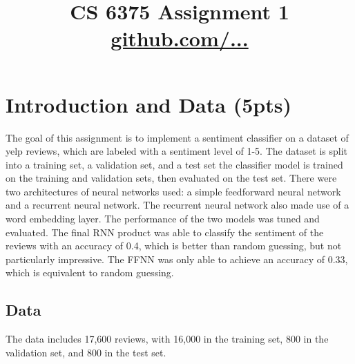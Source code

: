 \documentclass[conference]{IEEEtran}
\begin{document}
\title{CS 6375 Assignment 1 \\
\href{github.com/...}{github.com/...}
}

\author{
}

\maketitle


\section{Introduction and Data (5pts)}

The goal of this assignment is to implement a sentiment classifier on a dataset of yelp reviews, which are labeled with a sentiment level of 1-5. The dataset is split into a training set, a validation set, and a test set the classifier model is trained on the training and validation sets, then evaluated on the test set. There were two architectures of neural networks used: a simple feedforward neural network and a recurrent neural network. The recurrent neural network also made use of a word embedding layer. The performance of the two models was tuned and evaluated. 
The final RNN product was able to classify the sentiment of the reviews with an accuracy of 0.4, which is better than random guessing, but not particularly impressive. 
The FFNN was only able to achieve an accuracy of 0.33, which is equivalent to random guessing.

\subsection{Data} 

The data includes 17,600 reviews, with 16,000 in the training set, 800 in the validation set, and 800 in the test set. 

\end{document}
